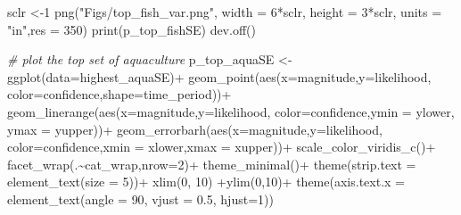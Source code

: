 \documentclass[
]{article}
\newenvironment{Shaded}{\begin{snugshade}}{\end{snugshade}}
\newcommand{\AttributeTok}[1]{\textcolor[rgb]{0.77,0.63,0.00}{#1}}
\newcommand{\CommentTok}[1]{\textcolor[rgb]{0.56,0.35,0.01}{\textit{#1}}}
\newcommand{\DecValTok}[1]{\textcolor[rgb]{0.00,0.00,0.81}{#1}}
\newcommand{\FloatTok}[1]{\textcolor[rgb]{0.00,0.00,0.81}{#1}}
\newcommand{\FunctionTok}[1]{\textcolor[rgb]{0.00,0.00,0.00}{#1}}
\newcommand{\NormalTok}[1]{#1}
\newcommand{\OtherTok}[1]{\textcolor[rgb]{0.56,0.35,0.01}{#1}}
\newcommand{\SpecialCharTok}[1]{\textcolor[rgb]{0.00,0.00,0.00}{#1}}
\newcommand{\StringTok}[1]{\textcolor[rgb]{0.31,0.60,0.02}{#1}}
\begin{document}
\begin{Shaded}
\begin{Highlighting}[]
\NormalTok{    sclr }\OtherTok{\textless{}{-}}\DecValTok{1}
    \FunctionTok{png}\NormalTok{(}\StringTok{"Figs/top\_fish\_var.png"}\NormalTok{,}
        \AttributeTok{width =} \DecValTok{6}\SpecialCharTok{*}\NormalTok{sclr, }\AttributeTok{height =} \DecValTok{3}\SpecialCharTok{*}\NormalTok{sclr, }\AttributeTok{units =} \StringTok{"in"}\NormalTok{,}\AttributeTok{res =} \DecValTok{350}\NormalTok{)}
    \FunctionTok{print}\NormalTok{(p\_top\_fishSE)}
    \FunctionTok{dev.off}\NormalTok{()}
    
     \CommentTok{\# plot the top set of aquaculture }
\NormalTok{    p\_top\_aquaSE }\OtherTok{\textless{}{-}} \FunctionTok{ggplot}\NormalTok{(}\AttributeTok{data=}\NormalTok{highest\_aquaSE)}\SpecialCharTok{+}
      \FunctionTok{geom\_point}\NormalTok{(}\FunctionTok{aes}\NormalTok{(}\AttributeTok{x=}\NormalTok{magnitude,}\AttributeTok{y=}\NormalTok{likelihood,}
                     \AttributeTok{color=}\NormalTok{confidence,}\AttributeTok{shape=}\NormalTok{time\_period))}\SpecialCharTok{+}
      \FunctionTok{geom\_linerange}\NormalTok{(}\FunctionTok{aes}\NormalTok{(}\AttributeTok{x=}\NormalTok{magnitude,}\AttributeTok{y=}\NormalTok{likelihood,}
                         \AttributeTok{color=}\NormalTok{confidence,}\AttributeTok{ymin =}\NormalTok{ ylower, }\AttributeTok{ymax =}\NormalTok{ yupper))}\SpecialCharTok{+}
      \FunctionTok{geom\_errorbarh}\NormalTok{(}\FunctionTok{aes}\NormalTok{(}\AttributeTok{x=}\NormalTok{magnitude,}\AttributeTok{y=}\NormalTok{likelihood,}
                         \AttributeTok{color=}\NormalTok{confidence,}\AttributeTok{xmin =}\NormalTok{ xlower,}\AttributeTok{xmax =}\NormalTok{ xupper))}\SpecialCharTok{+}
      \FunctionTok{scale\_color\_viridis\_c}\NormalTok{()}\SpecialCharTok{+}
      \FunctionTok{facet\_wrap}\NormalTok{(.}\SpecialCharTok{\textasciitilde{}}\NormalTok{cat\_wrap,}\AttributeTok{nrow=}\DecValTok{2}\NormalTok{)}\SpecialCharTok{+}
      \FunctionTok{theme\_minimal}\NormalTok{()}\SpecialCharTok{+} 
      \FunctionTok{theme}\NormalTok{(}\AttributeTok{strip.text =} \FunctionTok{element\_text}\NormalTok{(}\AttributeTok{size =} \DecValTok{5}\NormalTok{))}\SpecialCharTok{+}
      \FunctionTok{xlim}\NormalTok{(}\DecValTok{0}\NormalTok{, }\DecValTok{10}\NormalTok{) }\SpecialCharTok{+}\FunctionTok{ylim}\NormalTok{(}\DecValTok{0}\NormalTok{,}\DecValTok{10}\NormalTok{)}\SpecialCharTok{+} 
      \FunctionTok{theme}\NormalTok{(}\AttributeTok{axis.text.x =} \FunctionTok{element\_text}\NormalTok{(}\AttributeTok{angle =} \DecValTok{90}\NormalTok{, }\AttributeTok{vjust =} \FloatTok{0.5}\NormalTok{, }\AttributeTok{hjust=}\DecValTok{1}\NormalTok{))}


\end{Highlighting}
\end{Shaded}
\end{document}
